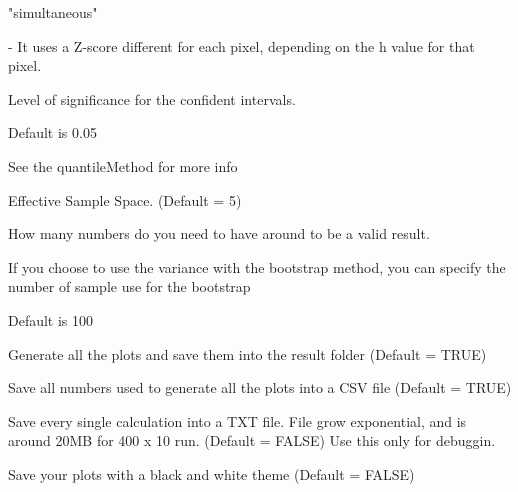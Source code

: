 \documentclass[letterpaper]{book}
\begin{document}
\begin{Arguments}
\begin{ldescription}
"simultaneous"

- It uses a Z-score different for each pixel,
depending on the h value for that pixel.

\item[\code{alpha}] Level of significance for the confident intervals.

Default is 0.05

See the quantileMethod for more info

\item[\code{ESSLimit}] Effective Sample Space. (Default = 5)

How many numbers do you need to have around to be a valid result.

\item[\code{bootstrapSample}] If you choose to use the variance with the bootstrap
method, you can specify the number of sample use for
the bootstrap

Default is 100

\item[\code{savePlots}] Generate all the plots and save them into the result folder (Default = TRUE)

\item[\code{saveCSV}] Save all numbers used to generate all the plots into a CSV file (Default = TRUE)

\item[\code{saveLog}] Save every single calculation into a TXT file. File grow exponential, and is around 20MB for 400 x 10 run. (Default = FALSE)
Use this only for debuggin.

\item[\code{blackAndWhite}] Save your plots with a black and white theme (Default = FALSE)
\end{ldescription}
\end{Arguments}
%
\end{document}
